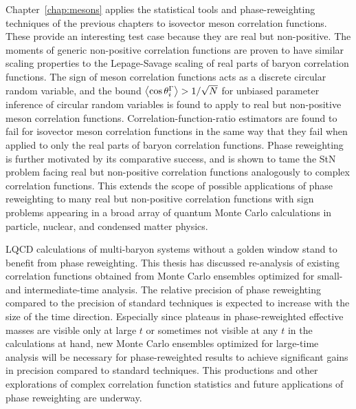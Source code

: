 Chapter~\ref{chap:mesons} applies the statistical tools and phase-reweighting techniques of the previous chapters to isovector meson correlation functions.
These provide an interesting test case because they are real but non-positive.
The moments of generic non-positive correlation functions are proven to have similar scaling properties to the Lepage-Savage scaling of real parts of baryon correlation functions.
The sign of meson correlation functions acts as a discrete circular random variable,
and the bound $\left< \cos\theta_i^\Gamma \right> > 1/\sqrt{N}$ for unbiased parameter inference of circular random variables is found to apply to real but non-positive meson correlation functions.
Correlation-function-ratio estimators are found to fail for isovector meson correlation functions in the same way that they fail when applied to only the real parts of baryon correlation functions.
Phase reweighting is further motivated by its comparative success, and is shown to tame the StN problem
facing real but non-positive correlation functions analogously to complex correlation functions.
This extends the scope of possible applications of phase reweighting to many real but non-positive correlation functions with sign problems appearing in a broad array of quantum Monte Carlo calculations in particle, nuclear, and condensed matter physics.

LQCD calculations of multi-baryon systems without a golden window stand to benefit from phase reweighting.
This thesis has discussed re-analysis of existing correlation functions obtained from Monte Carlo ensembles 
optimized for small- and intermediate-time analysis.
The relative precision of phase reweighting compared to the precision of standard techniques is expected to increase with the size of the time direction.
Especially since plateaus in phase-reweighted effective masses are visible only at large $t$ or sometimes not visible at any $t$ in the calculations at hand,
new Monte Carlo ensembles optimized for large-time analysis
will be necessary for phase-reweighted results
to achieve significant gains in precision compared to standard techniques.
This productions and other explorations of complex correlation function statistics and future applications of phase reweighting are underway.
